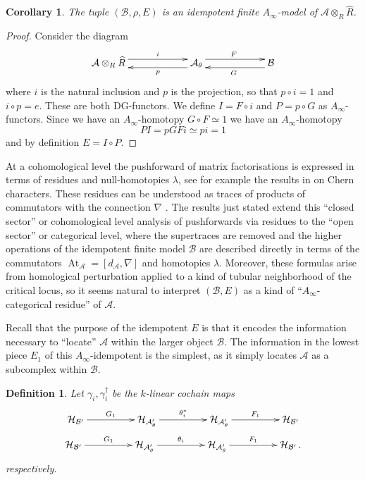 \documentclass[english,letter paper,12pt,leqno]{article}
\newtheorem{corollary}[theorem]{Corollary}
\theoremstyle{example}
\newtheorem{definition}[theorem]{Definition}
\numberwithin{equation}{section}
\def\AA{\mathcal{A}}
\def\BB{\mathcal{B}}
\def\HH{\HH}
\def\HH{\mathcal{H}}
\DeclareMathOperator{\vAt}{At}
\begin{document}
\begin{corollary}\label{corollary:idempotent_finite_model} The tuple $(\BB, \rho, E)$ is an idempotent finite $A_\infty$-model of $\AA \otimes_R \widehat{R}$.
\end{corollary}
\begin{proof}
Consider the diagram
\[
\xymatrix@C+3pc{
\AA \otimes_R \widehat{R} \ar@<1ex>[r]^-{i} & \AA_\theta \ar@<1ex>[l]^-{p} \ar@<1ex>[r]^F & \BB \ar@<1ex>[l]^G
}
\]
where $i$ is the natural inclusion and $p$ is the projection, so that $p \circ i = 1$ and $i \circ p = e$. These are both DG-functors. We define $I = F \circ i$ and $P = p \circ G$ as $A_\infty$-functors. Since we have an $A_\infty$-homotopy $G \circ F \simeq 1$ we have an $A_\infty$-homotopy
\[
P I = p G F i \simeq p i = 1
\]
and by definition $E = I \circ P$.
\end{proof}

At a cohomological level the pushforward of matrix factorisations is expressed in terms of residues and null-homotopies $\lambda$, see for example the results in \cite[\S 11.2]{pushforward} on Chern characters. These residues can be understood as traces of products of commutators with the connection $\nabla$ \cite[Proposition B.4]{pushforward}. The results just stated extend this ``closed sector'' or cohomological level analysis of pushforwards via residues to the ``open sector'' or categorical level, where the supertraces are removed and the higher operations of the idempotent finite model $\BB$ are described directly in terms of the commutators $\vAt_{\AA} = [d_{\AA}, \nabla]$ and homotopies $\lambda$. Moreover, these formulas arise from homological perturbation applied to a kind of tubular neighborhood of the critical locus, so it seems natural to interpret $(\BB, E)$ as a kind of ``$A_\infty$-categorical residue'' of $\AA$.
\vspace{0.2cm}

Recall that the purpose of the idempotent $E$ is that it encodes the information necessary to ``locate'' $\AA$ within the larger object $\BB$. The information in the lowest piece $E_1$ of this $A_\infty$-idempotent is the simplest, as it simply locates $\AA$ as a subcomplex within $\BB$. 

\begin{definition}\label{defn:gamma_anddagger} Let $\gamma_i, \gamma_i^\dagger$ be the $k$-linear cochain maps
\begin{gather*}
\xymatrix@C+2pc{
\HH_{\BB'} \ar[r]^-{G_1} & \HH_{\AA'_{\theta}} \ar[r]^-{\theta_i^*} & \HH_{\AA'_{\theta}} \ar[r]^-{F_1} & \HH_{\BB'}
}\\
\xymatrix@C+2pc{
\HH_{\BB'} \ar[r]^-{G_1} & \HH_{\AA'_{\theta}} \ar[r]^-{\theta_i} & \HH_{\AA'_{\theta}} \ar[r]^-{F_1} & \HH_{\BB'}\,.
}
\end{gather*}
respectively.
\end{definition}
\end{document}
